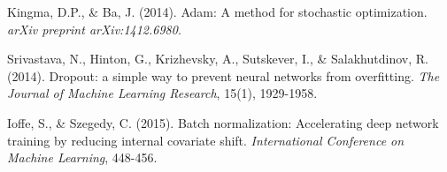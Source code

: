 \documentclass[12pt,a4paper]{article}
\begin{document}
\begin{thebibliography}{99}
Kingma, D.P., \& Ba, J. (2014). Adam: A method for stochastic optimization. \textit{arXiv preprint arXiv:1412.6980}.

Srivastava, N., Hinton, G., Krizhevsky, A., Sutskever, I., \& Salakhutdinov, R. (2014). Dropout: a simple way to prevent neural networks from overfitting. \textit{The Journal of Machine Learning Research}, 15(1), 1929-1958.

Ioffe, S., \& Szegedy, C. (2015). Batch normalization: Accelerating deep network training by reducing internal covariate shift. \textit{International Conference on Machine Learning}, 448-456.

\end{thebibliography}
\end{document}
